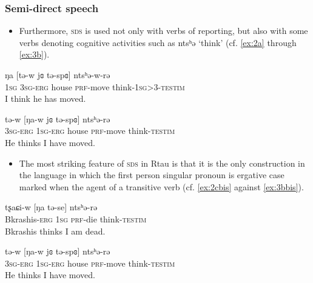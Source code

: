 \documentclass[xcolor=table]{beamer}
\newcommand{\ipa}[1]{{\phon #1}} %
\newcommand{\ipapl}[1]{{\phondroit #1}}
\newcommand{\const}{\textsc{testim}}
\newcommand{\erg}{\textsc{erg}}
\newcommand{\prf}{\textsc{prf}}
\newcommand{\sg}{\textsc{sg}}
\begin{document}
\begin{frame}%
\frametitle{Semi-direct speech}

\begin{itemize}

\item Furthermore, \textsc{sds} is used not only with verbs of reporting, but also with some verbs denoting cognitive activities such as \ipa{ntsʰə} `think' (cf. \ref{ex:2a} through \ref{ex:3b}).
\end{itemize}

\begin{exe}
\ex
\begin{xlist}
\ex \label{ex:3a}
\gll
	\ipa{ŋa} [\ipapl{tə-w}	 \ipapl{jɞ} \ipapl{tə-spɞ}] \ipa{ntsʰə-w-rə}  \\
	 {1\sg} {3\sg-\erg} house {\prf-move} {think-1\sg>3-\const}\\ 
	\glt I think he has moved.

\ex \label{ex:3b}
\gll
	 \ipa{tə-w} [\ipapl{ŋa-w} \ipapl{jɞ} \ipapl{tə-spɞ}] \ipa{ntsʰə-rə}  \\
	  {3\sg-\erg} {1\sg-\erg} house {\prf-move} {think-\const}\\ 
	\glt He thinks I have moved.
\end{xlist}
\end{exe}

\end{frame}

\begin{frame}

\begin{itemize}
 \item  The most striking feature of \textsc{sds} in Rtau is that it is the only construction in the language in which the first person singular pronoun is ergative case marked when the agent of a transitive verb (cf. \ref{ex:2cbis} against \ref{ex:3bbis}).
\end{itemize}

\begin{exe}

\ex \label{ex:2cbis}
\gll
	\ipa{tʂaɕi-w} [\ipapl{ŋa} \ipapl{tə-se}] \ipa{ntsʰə-rə}  \\
	{Bkrashis-\erg} {1\sg} {\prf-die} {think-\const}\\ 
	\glt Bkrashis thinks I am dead.

\ex \label{ex:3bbis}
\gll
	 \ipa{tə-w} [\ipapl{ŋa-w} \ipapl{jɞ} \ipapl{tə-spɞ}] \ipa{ntsʰə-rə}  \\
	  {3\sg-\erg} {1\sg-\erg} house {\prf-move} {think-\const}\\ 
	\glt He thinks I have moved.
\end{exe}

\end{frame}
\end{document}
